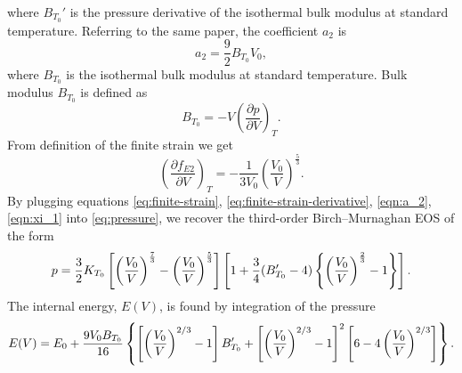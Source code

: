 where $B_{T_0}'$ is the pressure derivative of the isothermal bulk modulus at
standard temperature. Referring to the same paper, the coefficient $a_2$ is
\begin{equation}
  a_2 = \frac{9}{2} B_{T_0} V_0,
  \label{eqn:a_2}
\end{equation}
where $B_{T_0}$ is the isothermal bulk modulus at standard temperature. Bulk
modulus $B_{T_0}$ is defined as
\begin{equation}
  \label{eqn:bulk-modulus}
  B_{T_0} = -V \left(\frac{\partial p}{\partial V}\right)_T.
\end{equation}
From definition of the finite strain we get
\begin{equation}
  \left(\frac{\partial f_{E2}}{\partial V}\right)_T = - \frac{1}{3 V_0} \left(
    \frac{V_0}{V}
  \right)^{\frac{5}{3}}.
  \label{eq:finite-strain-derivative}
\end{equation}
By plugging equations \eqref{eq:finite-strain},
\eqref{eq:finite-strain-derivative}, \eqref{eqn:a_2}, \eqref{eqn:xi_1} into
\eqref{eq:pressure}, we recover the third-order Birch--Murnaghan EOS of
the form
\begin{equation}
  \small{p = \frac{3}{2} K_{T_0} \left[
    \left(\frac{V_0}{V}\right)^{\frac{7}{3}}
    - \left(\frac{V_0}{V}\right)^{\frac{5}{3}}
  \right] \left[
    1 + \frac{3}{4}(B_{T_0}' - 4)\left\{
      \left(\frac{V_0}{V}\right)^{\frac{2}{3}} - 1
    \right\}
  \right].}
\end{equation}
The internal energy, $E(V)$, is found by integration of the pressure
\begin{equation}\label{eqn:birch-murnaghan-energy}\scriptsize{
  E(V) = E_0 + \frac{9 V_0 B_{T_0}}{16} \left\{
    \left[\left(\frac{V_0}{V}\right)^{2/3} - 1\right] B_{T_0}' +
    \left[\left(\frac{V_0}{V}\right)^{2/3} - 1\right]^2
    \left[6 - 4 \left(\frac{V_0}{V}\right)^{2/3}\right]
  \right\}.
}\end{equation}
